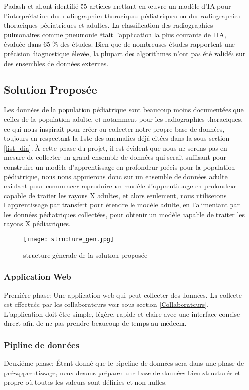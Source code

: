                 Padash et al.ont identifié 55 articles mettant en œuvre un modèle d'IA pour l'interprétation des radiographies thoraciques pédiatriques ou des radiographies thoraciques pédiatriques et adultes. La classification des radiographies pulmonaires comme pneumonie était l'application la plus courante de l'IA, évaluée dans 65 \% des études. Bien que de nombreuses études rapportent une précision diagnostique élevée, la plupart des algorithmes n'ont pas été validés sur des ensembles de données externes.

        \subsection{Solution Proposée}\label{Solution_prop}
        Les données de la population pédiatrique sont beaucoup moins documentées que celles de la population adulte, et notamment pour les radiographies thoraciques, ce qui nous inspirait pour créer ou collecter notre propre base de données, toujours en respectant la liste des anomalies déjà citées dans la sous-section  \ref{list_dia}.
        À cette phase du projet, il est évident que nous ne serons pas en mesure de collecter un grand ensemble de données qui serait suffisant pour construire un modèle d'apprentissage en profondeur précis pour la population pédiatrique, nous nous appuierons donc sur un ensemble de données adulte existant pour commencer reproduire un modèle d'apprentissage en profondeur capable de traiter les rayons X adultes, et alors seulement, nous utiliserons l'apprentissage par transfert pour étendre le modèle adulte, en l'alimentant par les données pédiatriques collectées, pour obtenir un modèle capable de traiter les rayons X pédiatriques.
        \begin{figure}[H]
            \centering
            \texttt{[image: structure\_gen.jpg]}
            \caption{structure génerale de la solution proposée}\label{fig:sol_prop}
        \end{figure}
            \subsubsection*{Application Web}
                Premiére phase:
                Une application web qui peut collecter des données. La collecte est effectuée par les collaborateurs voir sous-section \ref{Collaborateurs}. L'application doit être simple, légère, rapide et claire avec une interface concise direct afin de ne pas prendre beaucoup de temps au médecin.
            \subsubsection*{Pipline de données}
                Deuxiéme phase:
                Étant donné que le pipeline de données sera dans une phase de pré-apprentissage, nous devons préparer une base de données bien structurée et propre où toutes les valeurs sont définies et non nulles.
